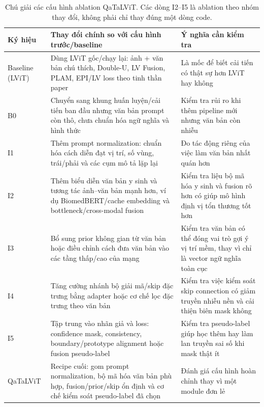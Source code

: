 \begin{table}[H]
  \centering
  \caption{Chú giải các cấu hình ablation QaTaLViT. Các dòng I2--I5 là ablation theo nhóm thay đổi, không phải chỉ thay đúng một dòng code.}
  \label{tab:qatalvit-ablation-legend}
  \scriptsize
  \renewcommand{\arraystretch}{1.12}
  \setlength{\tabcolsep}{4pt}
  \begin{tabularx}{\textwidth}{@{}p{} Y Y@{}}
    \toprule
    Ký hiệu & Thay đổi chính so với cấu hình trước/baseline & Ý nghĩa cần kiểm tra \\
    \midrule
    Baseline (LViT) & Dùng LViT gốc/chạy lại: ảnh + văn bản chú thích, Double-U, LV Fusion, PLAM, EPI/LV loss theo tinh thần paper & Là mốc để biết cải tiến có thật sự hơn LViT hay không \\
    B0 & Chuyển sang khung huấn luyện/cải tiến ban đầu nhưng văn bản prompt còn thô, chưa chuẩn hóa ngữ nghĩa và hình thức & Kiểm tra rủi ro khi thêm pipeline mới nhưng văn bản còn nhiễu \\
    I1 & Thêm prompt normalization: chuẩn hóa cách diễn đạt vị trí, số vùng, trái/phải và các cụm mô tả lặp lại & Đo tác động riêng của việc làm văn bản nhất quán hơn \\
    I2 & Thêm biểu diễn văn bản y sinh và tương tác ảnh--văn bản mạnh hơn, ví dụ BiomedBERT/cache embedding và bottleneck/cross-modal fusion & Kiểm tra liệu bộ mã hóa y sinh và fusion rõ hơn có giúp mô hình định vị tổn thương tốt hơn \\
    I3 & Bổ sung prior không gian từ văn bản hoặc điều chỉnh cách đưa văn bản vào các tầng thấp/cao của mạng & Kiểm tra văn bản có thể đóng vai trò gợi ý vị trí mềm, thay vì chỉ là vector ngữ nghĩa toàn cục \\
    I4 & Tăng cường nhánh bộ giải mã/skip đặc trưng bằng adapter hoặc cơ chế lọc đặc trưng theo văn bản & Kiểm tra việc kiểm soát skip connection có giảm truyền nhiễu nền và cải thiện biên mask không \\
    I5 & Tập trung vào nhãn giả và loss: confidence mask, consistency, boundary/prototype alignment hoặc fusion pseudo-label & Kiểm tra pseudo-label giúp học thêm hay làm lan truyền sai số khi mask thật ít \\
    QaTaLViT & Recipe cuối: gom prompt normalization, bộ mã hóa văn bản phù hợp, fusion/prior/skip ổn định và cơ chế kiểm soát pseudo-label đã chọn & Đánh giá cấu hình hoàn chỉnh thay vì một module đơn lẻ \\
    \bottomrule
  \end{tabularx}
\end{table}
\FloatBarrier

